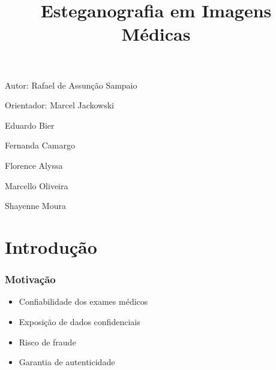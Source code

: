 \documentclass{beamer}
\title{Esteganografia em Imagens Médicas} %
\author{} %
\institute[USP] %
{
 \\ %
\medskip
\textit{} %
}
\date{} %
\begin{document}
\begin{frame}
\titlepage %
\end{frame}
\begin{frame}
Autor: Rafael de Assunção Sampaio

Orientador: Marcel Jackowski

\begin{flushright}
 Eduardo Bier
 
 Fernanda Camargo

 Florence Alyssa

 Marcello Oliveira

 Shayenne Moura
 \end{flushright} %
\end{frame}


\section{Introdução} 

\begin{frame}
\frametitle{Motivação}
\begin{itemize}
\item Confiabilidade dos exames médicos \newline
\item Exposição de dados confidenciais \newline
\item Risco de fraude \newline
\item Garantia de autenticidade
\end{itemize}

\end{frame}
\end{document}

